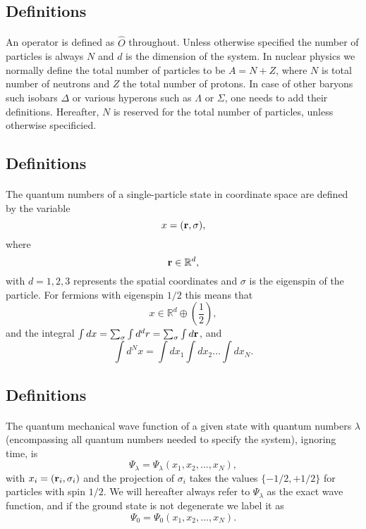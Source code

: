\documentclass[%
twoside,                 %
final,                   %
10pt]{article}
\begin{document}
\noindent




\subsection{Definitions}

\paragraph{}
An operator is defined as $\hat{O}$ throughout. Unless otherwise specified the number of particles is
always $N$ and $d$ is the dimension of the system.  In nuclear physics
we normally define the total number of particles to be $A=N+Z$, where
$N$ is total number of neutrons and $Z$ the total number of
protons. In case of other baryons such isobars $\Delta$ or various
hyperons such as $\Lambda$ or $\Sigma$, one needs to add their
definitions.  Hereafter, $N$ is reserved for the total number of
particles, unless otherwise specificied.



\subsection{Definitions}

\paragraph{}
The quantum numbers of a single-particle state in coordinate space are
defined by the variable 
\[
x=({\bf r},\sigma), 
\]
where 
\[
{\bf r}\in {\mathbb{R}}^{d},
\]
with $d=1,2,3$ represents the spatial coordinates and $\sigma$ is the eigenspin of the particle. For fermions with eigenspin $1/2$ this means that
\[
 x\in {\mathbb{R}}^{d}\oplus (\frac{1}{2}),
\]
and the integral $\int dx = \sum_{\sigma}\int d^dr = \sum_{\sigma}\int d{\bf r}$,
and
\[
\int d^Nx= \int dx_1\int dx_2\dots\int dx_N.
\]




\subsection{Definitions}

\paragraph{}
The quantum mechanical wave function of a given state with quantum numbers $\lambda$ (encompassing all quantum numbers needed to specify the system), ignoring time, is
\[
\Psi_{\lambda}=\Psi_{\lambda}(x_1,x_2,\dots,x_N),
\]
with $x_i=({\bf r}_i,\sigma_i)$ and the projection of $\sigma_i$ takes the values
$\{-1/2,+1/2\}$ for particles with spin $1/2$. 
We will hereafter always refer to $\Psi_{\lambda}$ as the exact wave function, and if the ground state is not degenerate we label it as 
\[
\Psi_0=\Psi_0(x_1,x_2,\dots,x_N).
\]
\end{document}
